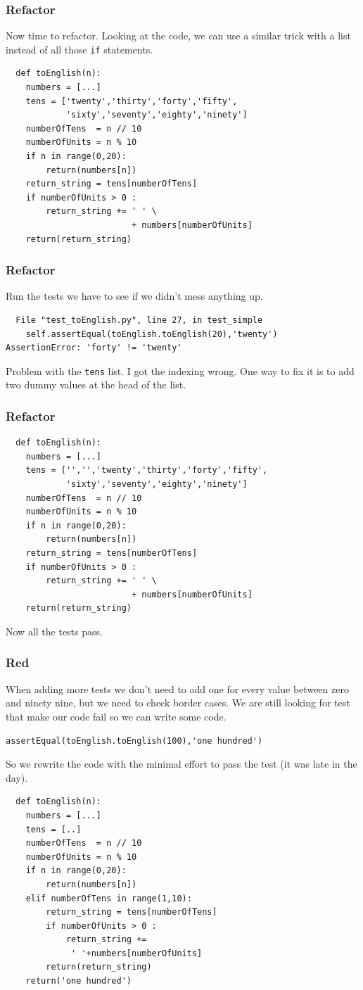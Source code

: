 \documentclass{beamer}
\begin{document}
\begin{frame}[fragile]
\frametitle{Refactor}
Now time to refactor. Looking at the code, we can use a similar trick
with a list instead of all those {\tt if} statements.
\begin{lstlisting}
  def toEnglish(n):
    numbers = [...]
    tens = ['twenty','thirty','forty','fifty',
            'sixty','seventy','eighty','ninety']
    numberOfTens  = n // 10
    numberOfUnits = n % 10
    if n in range(0,20):
        return(numbers[n])
    return_string = tens[numberOfTens]
    if numberOfUnits > 0 :
        return_string += ' ' \
                         + numbers[numberOfUnits]
    return(return_string)
\end{lstlisting}
\end{frame}
\begin{frame}[fragile]
  \frametitle{Refactor}
Run the tests we have to see if we didn't mess anything up.
\begin{verbatim}
  File "test_toEnglish.py", line 27, in test_simple
    self.assertEqual(toEnglish.toEnglish(20),'twenty')
AssertionError: 'forty' != 'twenty'
\end{verbatim}
Problem with the {\tt tens} list. I got the indexing wrong. One way to
fix it is to add two dummy values at the head of the list.
\end{frame}
\begin{frame}[fragile]
\frametitle{Refactor}
\begin{lstlisting}
  def toEnglish(n):
    numbers = [...]
    tens = ['','','twenty','thirty','forty','fifty',
            'sixty','seventy','eighty','ninety']
    numberOfTens  = n // 10
    numberOfUnits = n % 10
    if n in range(0,20):
        return(numbers[n])
    return_string = tens[numberOfTens]
    if numberOfUnits > 0 :
        return_string += ' ' \
                         + numbers[numberOfUnits]
    return(return_string)
\end{lstlisting}  
Now all the tests pass.
\end{frame}
\begin{frame}[fragile]
\frametitle{Red}
When adding more tests we don't need to add one for every value between
zero and ninety nine, but we need to check border cases. We are still
looking for test that make our code fail so we can write some code.
\begin{lstlisting}
assertEqual(toEnglish.toEnglish(100),'one hundred')
\end{lstlisting}
\end{frame}
\begin{frame}[fragile]
So we rewrite the code with the minimal effort to pass the test (it
was late in the day).
\begin{lstlisting}
  def toEnglish(n):
    numbers = [...]
    tens = [..] 
    numberOfTens  = n // 10
    numberOfUnits = n % 10
    if n in range(0,20):
        return(numbers[n])
    elif numberOfTens in range(1,10):
        return_string = tens[numberOfTens]
        if numberOfUnits > 0 :
            return_string += 
             ' '+numbers[numberOfUnits]
        return(return_string)
    return('one hundred')
\end{lstlisting}
\end{frame}
\end{document}
